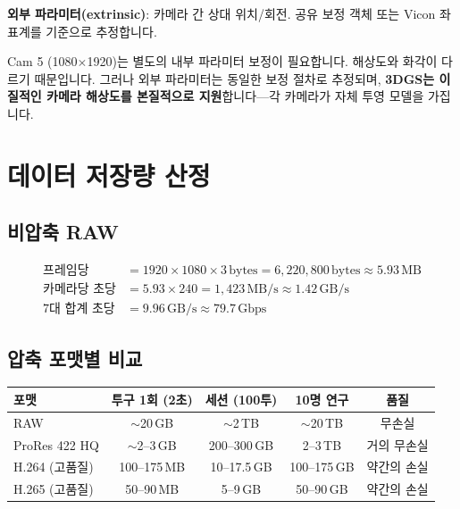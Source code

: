 \documentclass[11pt, a4paper]{report}
\begin{document}
\textbf{외부 파라미터(extrinsic)}: 카메라 간 상대 위치/회전. 공유 보정 객체 또는 Vicon 좌표계를 기준으로 추정합니다.

\begin{importantnote}[title={세로 카메라의 보정}]
Cam 5 (1080$\times$1920)는 별도의 내부 파라미터 보정이 필요합니다. 해상도와 화각이 다르기 때문입니다. 그러나 외부 파라미터는 동일한 보정 절차로 추정되며, \textbf{3DGS는 이질적인 카메라 해상도를 본질적으로 지원}합니다---각 카메라가 자체 투영 모델을 가집니다.
\end{importantnote}


\section{데이터 저장량 산정}
\label{sec:storage}

\subsection{비압축 RAW}

\begin{align}
\text{프레임당} &= 1920 \times 1080 \times 3\,\text{bytes} = 6{,}220{,}800\,\text{bytes} \approx 5.93\,\text{MB} \\
\text{카메라당 초당} &= 5.93 \times 240 = 1{,}423\,\text{MB/s} \approx 1.42\,\text{GB/s} \\
\text{7대 합계 초당} &= 9.96\,\text{GB/s} \approx 79.7\,\text{Gbps}
\end{align}

\subsection{압축 포맷별 비교}

\begin{center}
\renewcommand{\arraystretch}{1.3}
\begin{tabular}{lcccc}
\toprule
\textbf{포맷} & \textbf{투구 1회 (2초)} & \textbf{세션 (100투)} & \textbf{10명 연구} & \textbf{품질} \\
\midrule
RAW & $\sim$20\,GB & $\sim$2\,TB & $\sim$20\,TB & 무손실 \\
ProRes 422 HQ & $\sim$2--3\,GB & 200--300\,GB & 2--3\,TB & 거의 무손실 \\
H.264 (고품질) & 100--175\,MB & 10--17.5\,GB & 100--175\,GB & 약간의 손실 \\
H.265 (고품질) & 50--90\,MB & 5--9\,GB & 50--90\,GB & 약간의 손실 \\
\bottomrule
\end{tabular}
\end{center}
\end{document}
